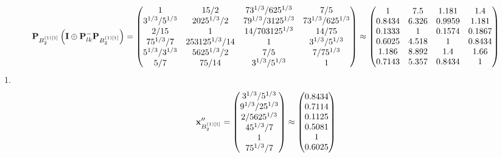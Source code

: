 \documentclass[10pt,a4paper]{article}
\begin{document}
	\[
		\bold{P}_{B_2^{(1)[1]}}\left(\bold{I} \oplus \bold{P}_{lk}^{-}\bold{P}_{B_2^{(1)[1]}}\right) = 
		\begin{pmatrix}
			{1}{} & {{15}} / {{2}} & {{7}{3^ {1 / 3}}} / {{625^ {1 / 3}}} & {{7}} / {{5}} \\
			{{3^ {1 / 3}}} / {{5^ {1 / 3}}} & {{2025^ {1 / 3}}} / {{2}} & {{7}{9^ {1 / 3}}} / {{3125^ {1 / 3}}} & {{7}{3^ {1 / 3}}} / {{625^ {1 / 3}}} \\
			{{2}} / {{15}} & {1}{} & {{14}} / {{703125^ {1 / 3}}} & {{14}} / {{75}} \\
			{{75^ {1 / 3}}} / {{7}} & {{253125^ {1 / 3}}} / {{14}} & {1}{} & {{3^ {1 / 3}}} / {{5^ {1 / 3}}} \\
			{{5^ {1 / 3}}} / {{3^ {1 / 3}}} & {{5625^ {1 / 3}}} / {{2}} & {{7}} / {{5}} & {{7}} / {{75^ {1 / 3}}} \\
			{{5}} / {{7}} & {{75}} / {{14}} & {{3^ {1 / 3}}} / {{5^ {1 / 3}}} & {1}{} \\
		\end{pmatrix}
		\approx
		\begin{pmatrix}
			1        & 7.5      & 1.181    & 1.4      \\
			0.8434   & 6.326    & 0.9959   & 1.181    \\
			0.1333   & 1        & 0.1574   & 0.1867   \\
			0.6025   & 4.518    & 1        & 0.8434   \\
			1.186    & 8.892    & 1.4      & 1.66     \\
			0.7143   & 5.357    & 0.8434   & 1        \\
		\end{pmatrix}
	\]
	1.
	\[
		\bold{x}''_{B_2^{(1)[1]}} = 
		\begin{pmatrix}
			{{3^ {1 / 3}}} / {{5^ {1 / 3}}} \\
			{{9^ {1 / 3}}} / {{25^ {1 / 3}}} \\
			{{2}} / {{5625^ {1 / 3}}} \\
			{{45^ {1 / 3}}} / {{7}} \\
			{1}{} \\
			{{75^ {1 / 3}}} / {{7}} \\
		\end{pmatrix}
		\approx
		\begin{pmatrix}
			0.8434   \\
			0.7114   \\
			0.1125   \\
			0.5081   \\
			1        \\
			0.6025   \\
		\end{pmatrix}
	\]
\end{document}
